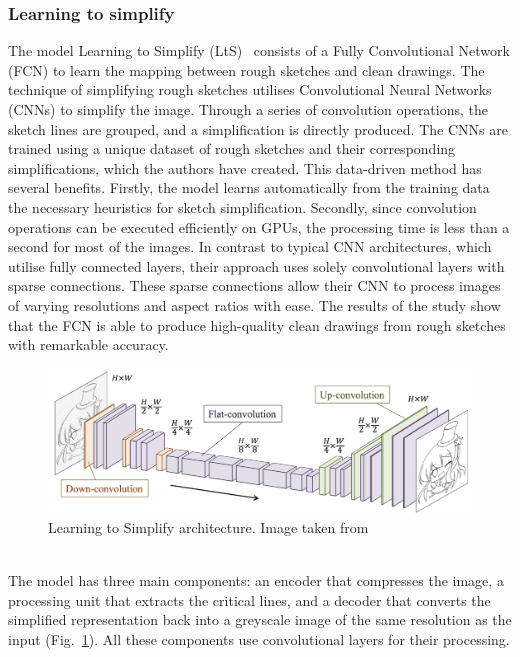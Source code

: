 \subsubsection{Learning to simplify}
\label{sec:learning to simplify}
The model Learning to Simplify (LtS)~\cite{SketchSimplify} consists of a Fully Convolutional Network (FCN) to learn the mapping between rough sketches and clean drawings. The technique of simplifying rough sketches utilises Convolutional Neural Networks (CNNs) to simplify the image. Through a series of convolution operations, the sketch lines are grouped, and a simplification is directly produced. The CNNs are trained using a unique dataset of rough sketches and their corresponding simplifications, which the authors have created. This data-driven method has several benefits. Firstly, the model learns automatically from the training data the necessary heuristics for sketch simplification. Secondly, since convolution operations can be executed efficiently on GPUs, the processing time is less than a second for most of the images. In contrast to typical CNN architectures, which utilise fully connected layers, their approach uses solely convolutional layers with sparse connections. These sparse connections allow their CNN to process images of varying resolutions and aspect ratios with ease. The results of the study show that the FCN is able to produce high-quality clean drawings from rough sketches with remarkable accuracy.
\begin{figure}[!ht]
\centering
  \includegraphics[scale=0.35]{figures/learnToSimplifyArchitecture.png}
  \caption{Learning to Simplify architecture. Image taken from~\cite{SketchSimplify}}
  \label{fig:Learning to Simplify architecture}
\end{figure}
\\
The model has three main components: an encoder that compresses the image, a processing unit that extracts the critical lines, and a decoder that converts the simplified representation back into a greyscale image of the same resolution as the input (Fig.~\ref{fig:Learning to Simplify architecture}). All these components use convolutional layers for their processing.

